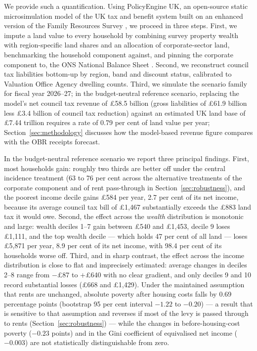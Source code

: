 We provide such a quantification. Using PolicyEngine UK, an open-source static microsimulation model of the UK tax and benefit system built on an enhanced version of the Family Resources Survey \citep{policyengine}, we proceed in three steps. First, we impute a land value to every household by combining survey property wealth with region-specific land shares and an allocation of corporate-sector land, benchmarking the household component against, and pinning the corporate component to, the ONS National Balance Sheet \citep{ons2025}. Second, we reconstruct council tax liabilities bottom-up by region, band and discount status, calibrated to Valuation Office Agency dwelling counts. Third, we simulate the scenario family for fiscal year 2026--27; in the budget-neutral reference scenario, replacing the model's net council tax revenue of \pounds 58.5 billion (gross liabilities of \pounds 61.9 billion less \pounds 3.4 billion of council tax reduction) against an estimated UK land base of \pounds 7.44 trillion requires a rate of 0.79 per cent of land value per year; Section~\ref{sec:methodology} discusses how the model-based revenue figure compares with the OBR receipts forecast.

In the budget-neutral reference scenario we report three principal findings. First, most households gain: roughly two thirds are better off under the central incidence treatment (63 to 76 per cent across the alternative treatments of the corporate component and of rent pass-through in Section~\ref{sec:robustness}), and the poorest income decile gains \pounds 584 per year, 2.7 per cent of its net income, because its average council tax bill of \pounds 1{,}467 substantially exceeds the \pounds 883 land tax it would owe. Second, the effect across the \emph{wealth} distribution is monotonic and large: wealth deciles 1--7 gain between \pounds 540 and \pounds 1{,}453, decile 9 loses \pounds 1{,}111, and the top wealth decile --- which holds 47 per cent of all land --- loses \pounds 5{,}871 per year, 8.9 per cent of its net income, with 98.4 per cent of its households worse off. Third, and in sharp contrast, the effect across the income distribution is close to flat and imprecisely estimated: average changes in deciles 2--8 range from $-$\pounds 87 to $+$\pounds 640 with no clear gradient, and only deciles 9 and 10 record substantial losses (\pounds 668 and \pounds 1{,}429). Under the maintained assumption that rents are unchanged, absolute poverty after housing costs falls by 0.69 percentage points (bootstrap 95 per cent interval $-1.22$ to $-0.20$) --- a result that is sensitive to that assumption and reverses if most of the levy is passed through to rents (Section~\ref{sec:robustness}) --- while the changes in before-housing-cost poverty ($-0.23$ points) and in the Gini coefficient of equivalised net income ($-0.003$) are not statistically distinguishable from zero.

